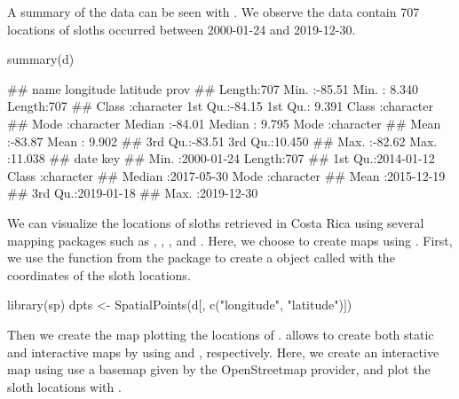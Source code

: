 A summary of the data can be seen with . We observe the data contain 707 locations of sloths occurred between 2000-01-24 and 2019-12-30.

\begin{example}
summary(d)

##     name             longitude         latitude          prov          
## Length:707         Min.   :-85.51   Min.   : 8.340   Length:707        
## Class :character   1st Qu.:-84.15   1st Qu.: 9.391   Class :character  
## Mode  :character   Median :-84.01   Median : 9.795   Mode  :character  
##                    Mean   :-83.87   Mean   : 9.902                     
##                    3rd Qu.:-83.51   3rd Qu.:10.450                     
##                    Max.   :-82.62   Max.   :11.038                     
##      date                key           
## Min.   :2000-01-24   Length:707        
## 1st Qu.:2014-01-12   Class :character  
## Median :2017-05-30   Mode  :character  
## Mean   :2015-12-19                     
## 3rd Qu.:2019-01-18                     
## Max.   :2019-12-30             
\end{example}

We can visualize the locations of sloths retrieved in Costa Rica using several mapping packages such as  \citep{Rtmap},  \citep{Rggplot2},  \citep{Rleaflet}, and  \citep{Rmapview}. Here, we choose to create maps using .
First, we use the  function from the  package \citep{Rsp} to create a  object called  with the coordinates of the sloth locations.

\begin{example}
library(sp)
dpts <- SpatialPoints(d[, c("longitude", "latitude")])
\end{example}

Then we create the map plotting the locations of .  allows to create both static and interactive maps by using  and , respectively. Here, we create an interactive map using use a basemap given by the OpenStreetmap provider, and plot the sloth locations with .




